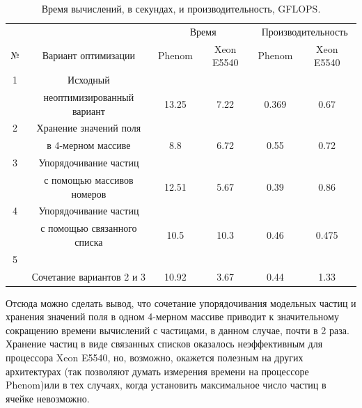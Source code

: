 \begin{table}[ht]
	\label{part_optim}
	\begin{center}
		\caption{Время вычислений,  в секундах, и производительность, GFLOPS.}
		\begin{tabular}{|c|c|c|c|c|c|}
\hline			

&& \multicolumn{2}{|c|}{Время} &	
   \multicolumn{2}{|c|}{Производительность}		\\		\cline{3-4} \cline{5-6}
№ &		 Вариант оптимизации                      & Phenom & Xeon  E5540  & Phenom & Xeon  E5540\\ \hline   	
1&Исходный                                          &        &            &        &            \\ 
 &неоптимизированный вариант                        & 13.25  & 7.22       &  0.369 & 0.67           \\ \hline  
2&Хранение значений поля                            &        &            &        &            \\
 & в 4-мерном массиве                               & 8.8    & 6.72       &  0.55  & 0.72       \\ \hline
3&Упорядочивание частиц                             &        &            &        &            \\ 
 & с помощью массивов номеров                       & 12.51  & 5.67       &  0.39  & 0.86           \\ \hline
4 &Упорядочивание частиц                             &        &           &        &            \\   
  & с помощью связанного списка                      & 10.5   & 10.3      &  0.46  & 0.475           \\ \hline
5 &                                                  &        &           &        &            \\
  &Сочетание вариантов 2 и 3			              & 10.92  & 3.67     &  0.44  & 1.33       \\ \hline 
		
\end{tabular}
\end{center}
\end{table}			



Отсюда можно сделать вывод, что сочетание упорядочивания модельных частиц и хранения значений поля в одном 4-мерном массиве приводит к значительному сокращению времени вычислений с частицами, в данном случае, почти в 2 раза. Хранение частиц в виде связанных списков оказалось неэффективным для процессора Xeon  E5540, но, возможно, окажется полезным на других архитектурах (так позволяют думать измерения времени на процессоре Phenom)или в тех случаях, когда установить максимальное число частиц в ячейке невозможно.

